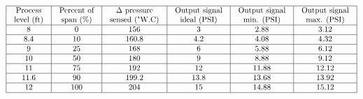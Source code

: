 






$$\vbox{\offinterlineskip
\halign{\strut
\vrule \quad\hfil # \ \hfil & 
\vrule \quad\hfil # \ \hfil & 
\vrule \quad\hfil # \ \hfil & 
\vrule \quad\hfil # \ \hfil & 
\vrule \quad\hfil # \ \hfil & 
\vrule \quad\hfil # \ \hfil \vrule \cr
\noalign{\hrule}
%
Process & Percent of & $\Delta$ pressure & Output signal & Output signal & Output signal \cr
%
level (ft) & span (\%) & sensed ("W.C) & ideal (PSI) & min. (PSI) & max. (PSI) \cr
%
\noalign{\hrule}
%
8 & 0 & 156 & 3 & 2.88 & 3.12 \cr
%
\noalign{\hrule}
%
8.4 & 10 & 160.8 & 4.2 & 4.08 & 4.32 \cr
%
\noalign{\hrule}
%
9 & 25 & 168 & 6 & 5.88 & 6.12 \cr
%
\noalign{\hrule}
%
10 & 50 & 180 & 9 & 8.88 & 9.12 \cr
%
\noalign{\hrule}
%
11 & 75 & 192 & 12 & 11.88 & 12.12 \cr
%
\noalign{\hrule}
%
11.6 & 90 & 199.2 & 13.8 & 13.68 & 13.92 \cr
%
\noalign{\hrule}
%
12 & 100 & 204 & 15 & 14.88 & 15.12 \cr
%
\noalign{\hrule}
} %
}$$ %











